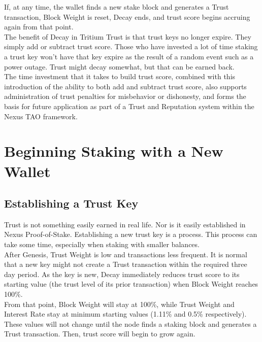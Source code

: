 \documentclass[11pt]{article}
\begin{document}
\noindent If, at any time, the wallet finds a new stake block and generates a Trust transaction, Block Weight is reset, Decay ends, and trust score begins accruing again from that point. \\

\noindent The benefit of Decay in Tritium Trust is that trust keys no longer expire. They simply add or subtract trust score. Those who have invested a lot of time staking a trust key won’t have that key expire as the result of a random event such as a power outage. Trust might decay somewhat, but that can be earned back.\\

\noindent The time investment that it takes to build trust score, combined with this introduction of the ability to both add and subtract trust score, also supports administration of trust penalties for misbehavior or dishonesty, and forms the basis for future application as part of a Trust and Reputation system within the Nexus TAO framework.\\

\bigskip

\section{Beginning Staking with a New Wallet}

\subsection{Establishing a Trust Key}
Trust is not something easily earned in real life. Nor is it easily established in Nexus Proof-of-Stake. Establishing a new trust key is a process. This process can take some time, especially when staking with smaller balances.\\

\noindent After Genesis, Trust Weight is low and transactions less frequent. It is normal that a new key might not create a Trust transaction within the required three day period. As the key is new, Decay immediately reduces trust score to its starting value (the trust level of its prior transaction) when Block Weight reaches 100\%.\\ 

\noindent From that point, Block Weight will stay at 100\%, while Trust Weight and Interest Rate stay at minimum starting values (1.11\% and 0.5\% respectively). These values will not change until the node finds a staking block and generates a Trust transaction. Then, trust score will begin to grow again.\\
\end{document}
